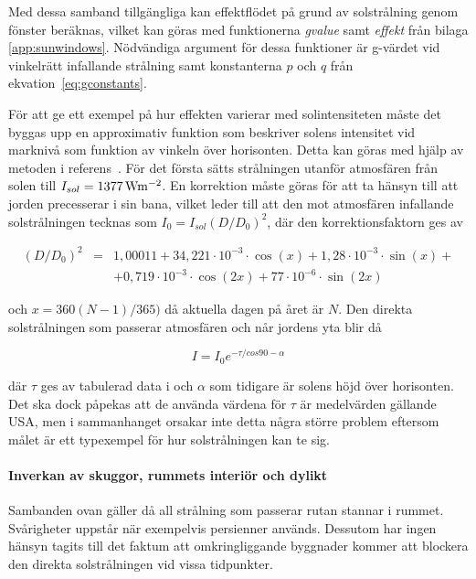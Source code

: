 Med dessa samband tillgängliga kan effektflödet på grund av solstrålning genom fönster beräknas, vilket kan göras med funktionerna \textit{gvalue} samt \textit{effekt} från bilaga \ref{app:sunwindows}. Nödvändiga argument för dessa funktioner är g-värdet vid vinkelrätt infallande strålning samt konstanterna $p$ och $q$ från ekvation~\eqref{eq:gconstants}. %

För att ge ett exempel på hur effekten varierar med solintensiteten måste det byggas upp en approximativ funktion som beskriver solens intensitet vid marknivå som funktion av vinkeln över horisonten. Detta kan göras med hjälp av metoden i referens~\cite{ozel11}. För det första sätts strålningen utanför atmosfären från solen till $I_{sol}=\unit[1377]{Wm^{-2}}$. En korrektion måste göras för att ta hänsyn till att jorden precesserar i sin bana, vilket leder till att den mot atmosfären infallande solstrålningen tecknas som $I_0 = I_{sol}\left( D/D_0\right)^2$, där den korrektionsfaktorn ges av

\begin{align}
\left( D/D_0 \right)^2 & = & 1,00011 + 34,221\cdot 10^{-3}\cdot \cos{\left(x\right)} + 1,28\cdot 10^{-3}\cdot \sin{\left(x\right)} + \nonumber\\
&& + 0,719\cdot 10^{-3}\cdot \cos{\left(2x\right)} + 77\cdot 10^{-6}\cdot \sin{\left(2x\right)}
\end{align}

och $x = 360\left( N-1\right) /365)$ då aktuella dagen på året är $N$. Den direkta solstrålningen som passerar atmosfären och når jordens yta blir då

\begin{equation}
I = I_0e^{-\tau / cos{90-\alpha}}
\end{equation}

där $\tau$ ges av tabulerad data i \cite{ozel11} och $\alpha$ som tidigare är solens höjd över horisonten. Det ska dock påpekas att de använda värdena för $\tau$ är medelvärden gällande USA, men i sammanhanget orsakar inte detta några större problem eftersom målet är ett typexempel för hur solstrålningen kan te sig.

\paragraph{Inverkan av skuggor, rummets interiör och dylikt}

Sambanden ovan gäller då all strålning som passerar rutan stannar i rummet. Svårigheter uppstår när exempelvis persienner används. Dessutom har ingen hänsyn tagits till det faktum att omkringliggande byggnader kommer att blockera den direkta solstrålningen vid vissa tidpunkter.

